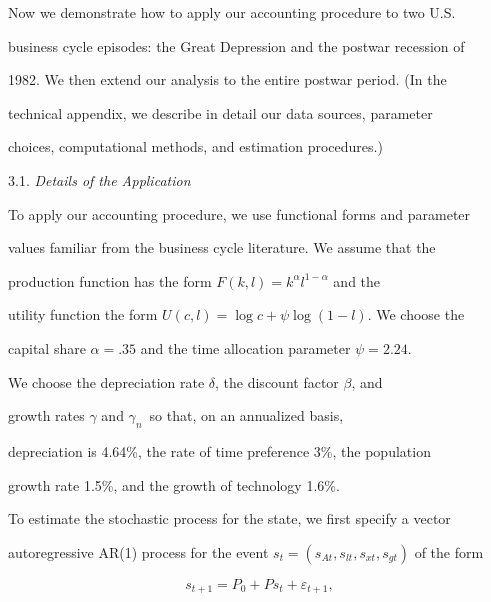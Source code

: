 \documentclass[fleqn,leqno,11pt]{article}
\begin{document}
Now we demonstrate how to apply our accounting procedure to two U.S.

business cycle episodes: the Great Depression and the postwar recession of

1982. We then extend our analysis to the entire postwar period. (In the

technical appendix, we describe in detail our data sources, parameter

choices, computational methods, and estimation procedures.)



\bigskip



\begin{center}

3.1. \emph{Details of the Application }

\end{center}



To apply our accounting procedure, we use functional forms and parameter

values familiar from the business cycle literature. We assume that the

production function has the form $F(k,l)=k^{\alpha }l^{1-\alpha }$ and the

utility function the form $U(c,l)=\log c+\psi \log (1-l).$ We choose the

capital share $\alpha =.35$ and the time allocation parameter $\psi =2.24.$

We choose the depreciation rate $\delta $, the discount factor $\beta $, and

growth rates $\gamma $ and $\gamma _{n}$\ so that, on an annualized basis,

depreciation is 4.64\%, the rate of time preference 3\%, the population

growth rate 1.5\%, and the growth of technology 1.6\%.



To estimate the stochastic process for the state, we first specify a vector

autoregressive AR(1) process for the event $%

s_{t}=(s_{At},s_{lt},s_{xt},s_{gt})$ of the form 

\begin{equation}

s_{t+1}=P_{0}+Ps_{t}+\varepsilon _{t+1},  \label{s process}

\end{equation}%
\end{document}
